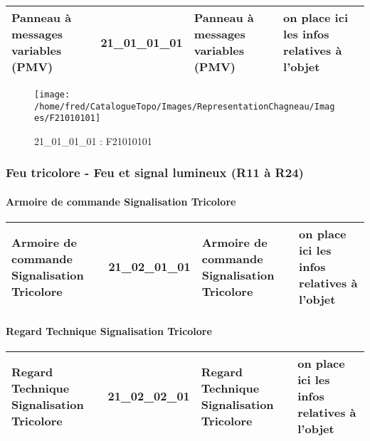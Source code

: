 \documentclass[12pt,titlepage,oneside]{book}
\begin{document}
\renewcommand{\arraystretch}{1.2}
\begin{supertabular}{|p{10cm}|c|p{13cm}|p{12cm}|}
 Panneau à messages variables (PMV) & 21\_01\_01\_01 & Panneau à messages variables (PMV) & on place ici les infos relatives à l'objet\\
\hline
\end{supertabular}
\begin{figure}[h!]
  \hfill         %
  \begin{minipage}[t]{3cm}
    \begin{center}
      \texttt{[image: /home/fred/CatalogueTopo/Images/RepresentationChagneau/Images/F21010101]}
      \caption[F21010101]{\label{} 21\_01\_01\_01 : F21010101}
    \end{center}
  \end{minipage}
\end{figure}

\subsubsection{\large Feu tricolore - Feu et signal lumineux (R11 à R24)}
\paragraph{Armoire de commande Signalisation Tricolore}
\noindent
\vspace{\baselineskip}

\renewcommand{\arraystretch}{1.2}
\begin{supertabular}{|p{10cm}|c|p{13cm}|p{12cm}|}
 Armoire de commande Signalisation Tricolore & 21\_02\_01\_01 & Armoire de commande Signalisation Tricolore & on place ici les infos relatives à l'objet\\
\hline
\end{supertabular}
\begin{figure}[h!]
  \hfill         %
\end{figure}


\paragraph{Regard Technique Signalisation Tricolore}
\noindent
\vspace{\baselineskip}

\renewcommand{\arraystretch}{1.2}
\begin{supertabular}{|p{10cm}|c|p{13cm}|p{12cm}|}
 Regard Technique Signalisation Tricolore & 21\_02\_02\_01 & Regard Technique Signalisation Tricolore & on place ici les infos relatives à l'objet\\
\hline
\end{supertabular}
\begin{figure}[h!]
  \hfill         %
\end{figure}
\end{document}
